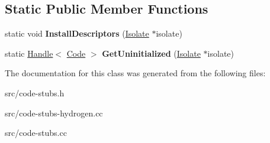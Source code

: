 \subsection*{Static Public Member Functions}
\begin{DoxyCompactItemize}
\item 
\hypertarget{classv8_1_1internal_1_1_to_boolean_stub_a78b25fe9e9e518e5da8374119c6dbdaf}{}static void {\bfseries Install\+Descriptors} (\hyperlink{classv8_1_1internal_1_1_isolate}{Isolate} $\ast$isolate)\label{classv8_1_1internal_1_1_to_boolean_stub_a78b25fe9e9e518e5da8374119c6dbdaf}

\item 
\hypertarget{classv8_1_1internal_1_1_to_boolean_stub_ab34a56da3b4b6e90484157da0d955de6}{}static \hyperlink{classv8_1_1internal_1_1_handle}{Handle}$<$ \hyperlink{classv8_1_1internal_1_1_code}{Code} $>$ {\bfseries Get\+Uninitialized} (\hyperlink{classv8_1_1internal_1_1_isolate}{Isolate} $\ast$isolate)\label{classv8_1_1internal_1_1_to_boolean_stub_ab34a56da3b4b6e90484157da0d955de6}

\end{DoxyCompactItemize}


The documentation for this class was generated from the following files\+:\begin{DoxyCompactItemize}
\item 
src/code-\/stubs.\+h\item 
src/code-\/stubs-\/hydrogen.\+cc\item 
src/code-\/stubs.\+cc\end{DoxyCompactItemize}
